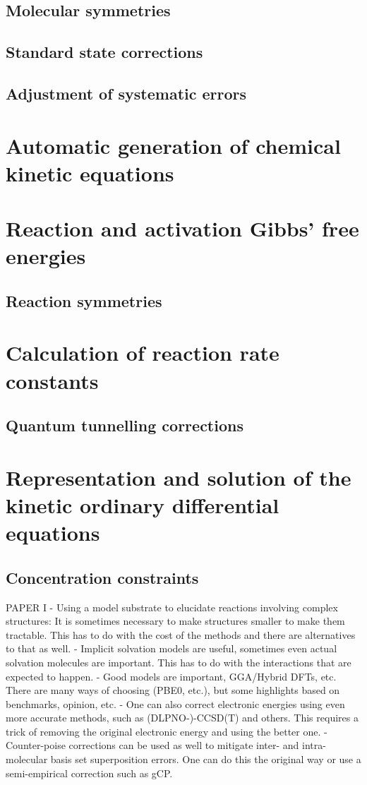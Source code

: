 \subsection{Molecular symmetries}
\subsection{Standard state corrections}
\subsection{Adjustment of systematic errors}
\section{Automatic generation of chemical kinetic equations}
\section{Reaction and activation Gibbs' free energies}
\subsection{Reaction symmetries}
\section{Calculation of reaction rate constants}
\subsection{Quantum tunnelling corrections}
\section{Representation and solution of the kinetic ordinary differential equations}
\subsection{Concentration constraints}


PAPER I
- Using a model substrate to elucidate reactions involving complex structures:
It is sometimes necessary to make structures smaller to make them tractable.
This has to do with the cost of the methods and there are alternatives to that as well.
- Implicit solvation models are useful,
sometimes even actual solvation molecules are important.
This has to do with the interactions that are expected to happen.
- Good models are important,
GGA/Hybrid DFTs,
etc.
There are many ways of choosing (PBE0,
etc.),
but some highlights based on benchmarks,
opinion,
etc.
- One can also correct electronic energies using even more accurate methods,
such as (DLPNO-)-CCSD(T) and others.
This requires a trick of removing the original electronic energy and using the better one.
- Counter-poise corrections can be used as well to mitigate inter- and intra-molecular basis set superposition errors.
One can do this the original way or use a semi-empirical correction such as gCP.\@

